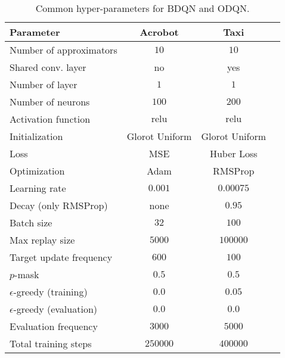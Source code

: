 \begin{table}[h]
	\begin{tabular}{ l c c c}
		\textbf{Parameter} & \textbf{Acrobot} & \textbf{Taxi}  \\
		\hline
		Number of approximators & $10$ & $10$ &\\ 
		Shared conv. layer & no & yes \\  
		Number of layer & $1$ &  $1$\\  
		Number of neurons & $100$ &  $200$\\  
		Activation function & $\mathrm{relu}$ & $\mathrm{relu}$  \\
		Initialization & Glorot Uniform & Glorot Uniform \\
		Loss & MSE & Huber Loss \\
		Optimization & Adam & RMSProp \\
		Learning rate & $0.001$ & $0.00075$ \\
		Decay (only RMSProp) & none & $0.95$ \\
		Batch size & $32$ & $100$ \\
		Max replay size & $5000$ & $100000$ \\
		Target update frequency & $600$ & $100$ \\
		$p$-mask & $0.5$ & $0.5$ \\
		$\epsilon$-greedy (training) & $0.0$ & $0.05$ \\
		$\epsilon$-greedy (evaluation) & $0.0$ & $0.0$ \\
		Evaluation frequency & $3000$ & $5000$ \\
		Total training steps & $250000$ & $400000$ 
	\end{tabular}
	\caption{Common hyper-parameters for BDQN and ODQN.\label{taxitable}}
\end{table} 
